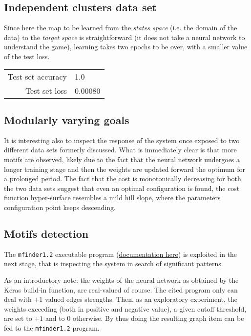 \documentclass[a4paper,12pt]{article}
\begin{document}


\subsection{Independent clusters data set}

Since here the map to be learned from the \textit{states space} (i.e. the domain of the data) to the \textit{target space} is straightforward (it does not take a neural network to understand the game), learning takes two epochs to be over, with a smaller value of the test loss.

\begin{table}[h!]
	\begin{center}
		\begin{tabular}{r l}
			Test set accuracy     & 1.0 \\
			Test set loss         & 0.00080
		\end{tabular}
	\end{center}
\end{table}


\subsection{Modularly varying goals}

It is interesting also to inspect the response of the system once exposed to two different data sets formerly discussed. What is immediately clear is that more motifs are observed, likely due to the fact that the neural network undergoes a longer training stage and then the weights are updated forward the optimum for a prolonged period. The fact that the cost is monotonically decreasing for both the two data sets suggest that even an optimal configuration is found, the cost function hyper-surface resembles a mild hill slope, where the parameters configuration point keeps descending. 


\subsection{Motifs detection}

The \texttt{mfinder1.2} executable program (\href{http://www.weizmann.ac.il/mcb/UriAlon/download/network-motif-software}{documentation here}) is exploited in the next stage, that is inspecting the system in search of significant patterns.

As an introductory note: the weights of the neural network as obtained by the \textsf{Keras} build-in function, are real-valued of course. The cited program only can deal with $+1$ valued edges strengths. Then, as an exploratory experiment, the weights exceeding (both in positive and negative value), a given cutoff threshold, are set to $+1$ and to $0$ otherwise. By thus doing the resulting graph item can be fed to the \texttt{mfinder1.2} program. 
\end{document}

